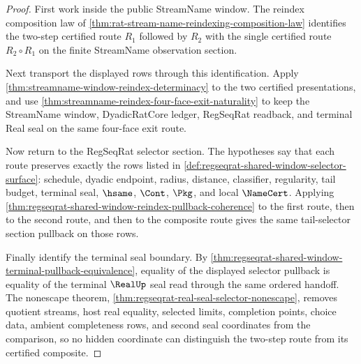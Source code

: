 \begin{proof}
First work inside the public StreamName window. The reindex composition law of \autoref{thm:rat-stream-name-reindexing-composition-law} identifies the two-step certified route $R_1$ followed by $R_2$ with the single certified route $R_2 \circ R_1$ on the finite StreamName observation section.

Next transport the displayed rows through this identification. Apply \autoref{thm:streamname-window-reindex-determinacy} to the two certified presentations, and use \autoref{thm:streamname-reindex-four-face-exit-naturality} to keep the StreamName window, DyadicRatCore ledger, RegSeqRat readback, and terminal Real seal on the same four-face exit route.

Now return to the RegSeqRat selector section. The hypotheses say that each route preserves exactly the rows listed in \autoref{def:regseqrat-shared-window-selector-surface}: schedule, dyadic endpoint, radius, distance, classifier, regularity, tail budget, terminal seal, $\hsame$, $\Cont$, $\Pkg$, and local $\NameCert$. Applying \autoref{thm:regseqrat-shared-window-reindex-pullback-coherence} to the first route, then to the second route, and then to the composite route gives the same tail-selector section pullback on those rows.

Finally identify the terminal seal boundary. By \autoref{thm:regseqrat-shared-window-terminal-pullback-equivalence}, equality of the displayed selector pullback is equality of the terminal $\RealUp$ seal read through the same ordered handoff. The nonescape theorem, \autoref{thm:regseqrat-real-seal-selector-nonescape}, removes quotient streams, host real equality, selected limits, completion points, choice data, ambient completeness rows, and second seal coordinates from the comparison, so no hidden coordinate can distinguish the two-step route from its certified composite.
\end{proof}

